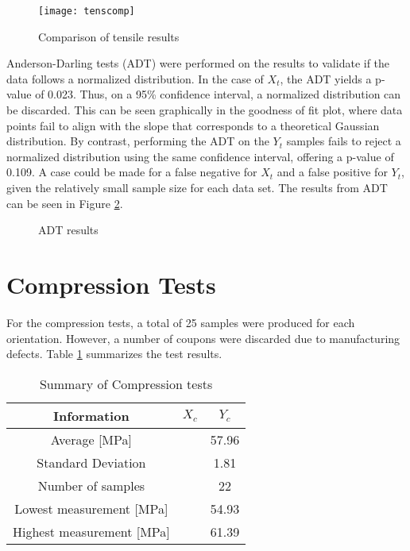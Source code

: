\documentclass[main.tex]{subfiles}
\begin{document}
\begin{figure}[h]
	\center
	\texttt{[image: tenscomp]}
	\caption{Comparison of tensile results} \label{fig:tensComp}
\end{figure}

Anderson-Darling tests (ADT) were performed on the results to validate if the data follows a normalized distribution. In the case of $X_t$, the ADT yields a p-value of 0.023. Thus, on a 95\% confidence interval, a normalized distribution can be discarded. This can be seen graphically in the goodness of fit plot, where data points fail to align with the slope that corresponds to a theoretical Gaussian distribution. By contrast, performing the ADT on the $Y_t$ samples fails to reject a normalized distribution using the same confidence interval, offering a p-value of 0.109. A case could be made for a false negative for $X_t$ and a false positive for $Y_t$, given the relatively small sample size for each data set. The results from ADT can be seen in Figure \ref{fig:adttens}.

\begin{figure}[!htbp]
	\center
	\hfill
	\caption{ADT results} \label{fig:adttens}
\end{figure}
      
\section{Compression Tests} \label{sec:compr}
For the compression tests, a total of 25 samples were produced for each orientation. However, a number of coupons were discarded due to manufacturing defects. Table \ref{tab:comprtab} summarizes the test results.  

\begin{table} [h]
	\centering
	\caption{Summary of Compression tests}
	\begin{tabular}{ c| c c } 
		\toprule
		\textbf{Information} & $X_c$ & $Y_c$\\
		\midrule
		Average [MPa] &  & 57.96\\
		Standard Deviation &  & 1.81\\
		Number of samples &  & 22\\
		Lowest measurement [MPa] & &54.93 \\
		Highest measurement [MPa] & &61.39 \\
		\bottomrule
	\end{tabular}
\label{tab:comprtab}
\end{table}
\end{document}
